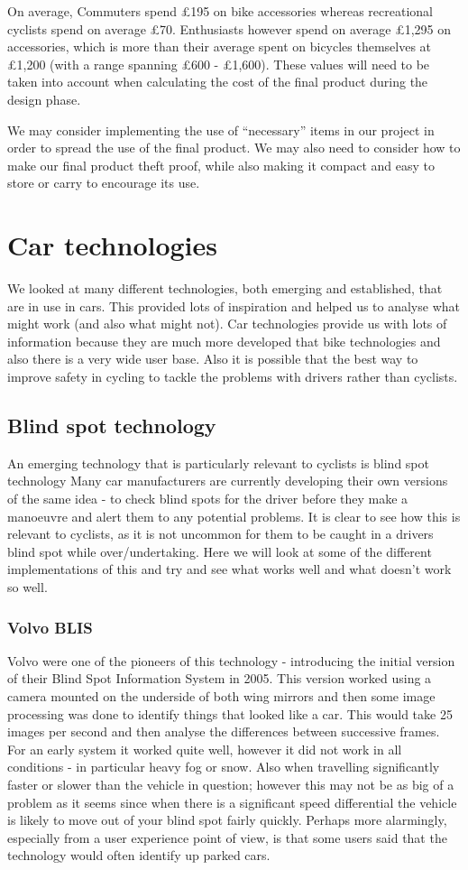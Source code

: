 \documentclass[a4paper]{report}
\begin{document}
{On average, Commuters spend £195 on bike accessories whereas recreational cyclists spend on average £70. Enthusiasts however spend on average £1,295 on accessories, which is more than their average spent on bicycles themselves at £1,200 (with a range spanning £600 - £1,600). These values will need to be taken into account when calculating the cost of the final product during the design phase. 

We may consider implementing the use of “necessary” items in our project in order to spread the use of the final product. We may also need to consider how to make our final product theft proof, while also making it compact and easy to store or carry to encourage its use.

\newpage
\section{Car technologies}
We looked at many different technologies, both emerging and established, that are in use in cars. This provided lots of inspiration and helped us to analyse what might work (and also what might not). Car technologies provide us with lots of information because they are much more developed that bike technologies and also there is a very wide user base. Also it is possible that the best way to improve safety in cycling to tackle the problems with drivers rather than cyclists.
\subsection{Blind spot technology}
An emerging technology that is particularly relevant to cyclists is blind spot technology Many car manufacturers are currently developing their own versions of the same idea - to check blind spots for the driver before they make a manoeuvre and alert them to any potential problems. It is clear to see how this is relevant to cyclists, as it is not uncommon for them to be caught in a drivers blind spot while over/undertaking. Here we will look at some of the different implementations of this and try and see what works well and what doesn't work so well.
\subsubsection{Volvo BLIS}
Volvo were one of the pioneers of this technology - introducing the initial version of their Blind Spot Information System in 2005\cite{volvo_blis}. This version worked using a camera mounted on the underside of both wing mirrors and then some image processing was done to identify things that looked like a car. This would take 25 images per second and then analyse the differences between successive frames. For an early system it worked quite well, however it did not work in all conditions - in particular heavy fog or snow. Also when travelling significantly faster or slower than the vehicle in question; however this may not be as big of a problem as it seems since when there is a significant speed differential the vehicle is likely to move out of your blind spot fairly quickly. Perhaps more alarmingly, especially from a user experience point of view, is that some users said that the technology would often identify up parked cars. 

}
\end{document}
